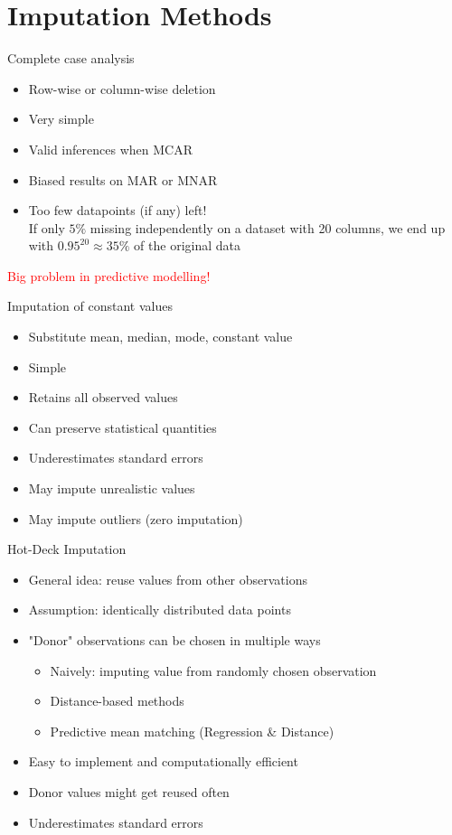 \documentclass[aspectratio=43]{beamer}
\newcommand\pro{\item[$+$]}
\newcommand\con{\item[$-$]}
\begin{document}
\section{Imputation Methods}

\begin{frame}{Complete case analysis}
\begin{itemize}
\item Row-wise or column-wise deletion
\end{itemize}
\begin{itemize}
\pro Very simple
\pro Valid inferences when MCAR
\end{itemize}
\begin{itemize}
\con Biased results on MAR or MNAR
\con Too few datapoints (if any) left!\\
If only $5\%$ missing independently on a dataset with 20 columns, we end up with $0.95^{20} \approx 35\%$ of the original data\\
\end{itemize}
\textcolor{red}{Big problem in predictive modelling!}
\end{frame}

\begin{frame}{Imputation of constant values}
\begin{itemize}
\item Substitute mean, median, mode, constant value
\end{itemize}
\begin{itemize}
\pro Simple
\pro Retains all observed values
\pro Can preserve statistical quantities
\end{itemize}
\begin{itemize}
\con Underestimates standard errors
\con May impute unrealistic values
\con May impute outliers (zero imputation)
\end{itemize}
\end{frame}

\begin{frame}{Hot-Deck Imputation}
\begin{itemize}
	\item General idea: reuse values from other observations
	\item Assumption: identically distributed data points
	\item "Donor" observations can be chosen in multiple ways
	\begin{itemize}
		\item Naively: imputing value from randomly chosen observation
		\item Distance-based methods
		\item Predictive mean matching (Regression \& Distance)
	\end{itemize}
\end{itemize}
\begin{itemize}
	\pro Easy to implement and computationally efficient
\end{itemize}
\begin{itemize}
	\con Donor values might get reused often
	\con Underestimates standard errors
\end{itemize}
\end{frame}
\end{document}
